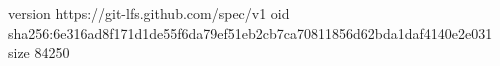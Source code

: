 version https://git-lfs.github.com/spec/v1
oid sha256:6e316ad8f171d1de55f6da79ef51eb2cb7ca70811856d62bda1daf4140e2e031
size 84250
